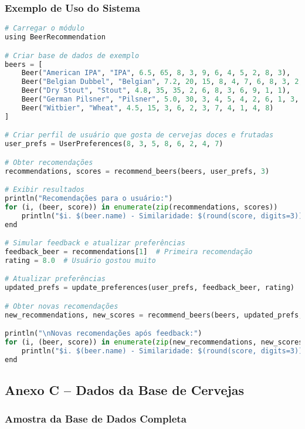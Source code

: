 \documentclass[12pt,a4paper]{article}
\begin{document}
\subsubsection{Exemplo de Uso do Sistema}

\begin{lstlisting}[language=Python, caption=Exemplo de uso do sistema de recomendação]
# Carregar o módulo
using BeerRecommendation

# Criar base de dados de exemplo
beers = [
    Beer("American IPA", "IPA", 6.5, 65, 8, 3, 9, 6, 4, 5, 2, 8, 3),
    Beer("Belgian Dubbel", "Belgian", 7.2, 20, 15, 8, 4, 7, 6, 8, 3, 2, 4),
    Beer("Dry Stout", "Stout", 4.8, 35, 35, 2, 6, 8, 3, 6, 9, 1, 1),
    Beer("German Pilsner", "Pilsner", 5.0, 30, 3, 4, 5, 4, 2, 6, 1, 3, 5),
    Beer("Witbier", "Wheat", 4.5, 15, 3, 6, 2, 3, 7, 4, 1, 4, 8)
]

# Criar perfil de usuário que gosta de cervejas doces e frutadas
user_prefs = UserPreferences(8, 3, 5, 8, 6, 2, 4, 7)

# Obter recomendações
recommendations, scores = recommend_beers(beers, user_prefs, 3)

# Exibir resultados
println("Recomendações para o usuário:")
for (i, (beer, score)) in enumerate(zip(recommendations, scores))
    println("$i. $(beer.name) - Similaridade: $(round(score, digits=3))")
end

# Simular feedback e atualizar preferências
feedback_beer = recommendations[1]  # Primeira recomendação
rating = 8.0  # Usuário gostou muito

# Atualizar preferências
updated_prefs = update_preferences(user_prefs, feedback_beer, rating)

# Obter novas recomendações
new_recommendations, new_scores = recommend_beers(beers, updated_prefs, 3)

println("\nNovas recomendações após feedback:")
for (i, (beer, score)) in enumerate(zip(new_recommendations, new_scores))
    println("$i. $(beer.name) - Similaridade: $(round(score, digits=3))")
end
\end{lstlisting}

\subsection{Anexo C -- Dados da Base de Cervejas}

\subsubsection{Amostra da Base de Dados Completa}
\end{document}
